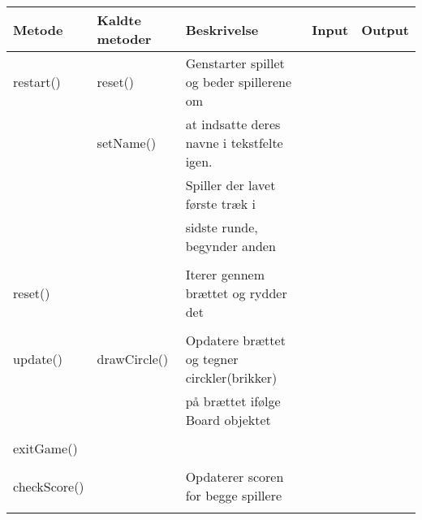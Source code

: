 \begin{table}[H]
    \centering
    \caption{}\label{tbl:2}
    \begin{tabular}{lllll}
        \toprule
        Metode           & Kaldte metoder  & Beskrivelse                                       & Input & Output \\
        \midrule
        restart()        & reset()         & Genstarter spillet og beder spillerene om                          \\
                         & setName()       & at indsatte deres navne  i tekstfelte igen.                        \\
                         &                 & Spiller der lavet første træk i                                    \\
                         &                 & sidste runde, begynder anden                                       \\
        \\
        reset()          &                 & Iterer gennem brættet og rydder det                                \\
        \\
        update()         & drawCircle()    & Opdatere brættet og tegner circkler(brikker)                       \\
                         &                 & på brættet ifølge Board objektet                                   \\
        \\
        exitGame()                                                                                              \\
        \\
        checkScore()     &                 & Opdaterer scoren for begge spillere                                \\
        \\


\end{tabular}
\end{table}
